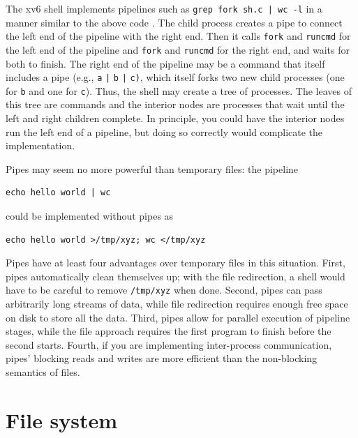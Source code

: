 The xv6 shell implements pipelines such as
\lstinline{grep fork sh.c | wc -l}
in a manner similar to the above code
.
The child process creates a pipe to connect the left end of the pipeline
with the right end. Then it calls
\lstinline{fork}
and
\lstinline{runcmd}
for the left end of the pipeline
and 
\lstinline{fork}
and
\lstinline{runcmd}
for the right end, and waits for both to finish.
The right end of the pipeline may be a command that itself includes a
pipe (e.g.,
\lstinline{a}
\lstinline{|}
\lstinline{b}
\lstinline{|}
\lstinline{c)}, 
which itself forks two new child processes (one for
\lstinline{b}
and one for
\lstinline{c}).
Thus, the shell may
create a tree of processes.  The leaves of this tree are commands and
the interior nodes are processes that wait until the left and right
children complete.  In principle, you could have the interior nodes
run the left end of a pipeline, but doing so correctly would complicate the
implementation.

Pipes may seem no more powerful than temporary files:
the pipeline
\begin{lstlisting}[]
echo hello world | wc
\end{lstlisting}
could be implemented without pipes as
\begin{lstlisting}[]
echo hello world >/tmp/xyz; wc </tmp/xyz
\end{lstlisting}
Pipes have at least four advantages over temporary files
in this situation.
First, pipes automatically clean themselves up;
with the file redirection, a shell would have to
be careful to remove
\lstinline{/tmp/xyz}
when done.
Second, pipes can pass arbitrarily long streams of
data, while file redirection requires enough free space
on disk to store all the data.
Third, pipes allow for parallel execution of pipeline stages,
while the file approach requires the first program to finish
before the second starts.
Fourth, if you are implementing inter-process communication,
pipes' blocking reads and writes are more efficient
than the non-blocking semantics of files.
\section{File system}

